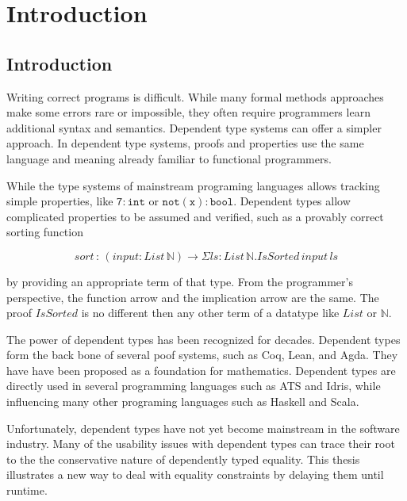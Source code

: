 \chapter{Introduction}
\label{chapter:Introduction}
\thispagestyle{myheadings}

\section{Introduction} %

Writing correct programs is difficult.
While many formal methods approaches make some errors rare or impossible, they often require programmers learn additional syntax and semantics.
Dependent type systems can offer a simpler approach.
In dependent type systems, proofs and properties use the same language and meaning already familiar to functional programmers.

While the type systems of mainstream programing languages allows tracking simple properties, like $\mathtt{7:int}$ or $\mathtt{not(x):bool}$.
Dependent types allow complicated properties to be assumed and verified, such as a provably correct sorting function 

\[
sort\,:\,\left(input:List\,\mathbb{N}\right)\rightarrow\Sigma ls:List\,\mathbb{N}.IsSorted\,input\,ls
\]

by providing an appropriate term of that type.
From the programmer's perspective, the function arrow and the implication arrow are the same.
The proof $IsSorted$ is no different then any other term of a datatype like $List$ or $\mathbb{N}$. 

The power of dependent types has been recognized for decades.
Dependent types form the back bone of several poof systems, such as Coq\cite{Coq12}, Lean\cite{10.1007/978-3-030-79876-5_37}, and Agda\cite{norell2007towards}.
They have have been proposed as a foundation for mathematics\cite{Martin-Lof-1972,HoTTbook}.
Dependent types are directly used in several programming languages such as ATS\cite{DependentMLAnapproachtopracticalprogrammingwithdependenttypes} and Idris\cite{brady2013idris}, while influencing many other programing languages such as Haskell and Scala.

Unfortunately, dependent types have not yet become mainstream in the software industry.
Many of the usability issues with dependent types can trace their root to the the conservative nature of dependently typed equality.
This thesis illustrates a new way to deal with equality constraints by delaying them until runtime.

